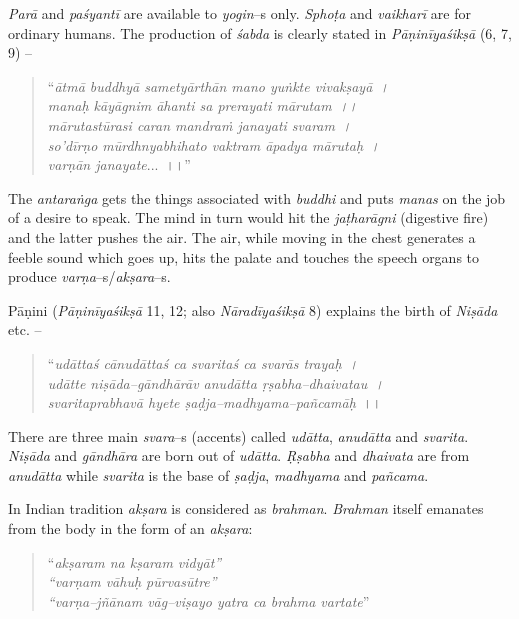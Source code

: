 \textit{Parā} and \textit{paśyantī} are available to \textit{yogin}–s only. \textit{Sphoṭa} and \textit{vaikharī} are for ordinary humans. The production of \textit{śabda} is clearly stated in \textit{Pāṇinīyaśikṣā} (6, 7, 9) –

\begin{verse}
“\textit{ātmā buddhyā sametyārthān mano yuṅkte vivakṣayā~।}\\\textit{manaḥ kāyāgnim āhanti sa prerayati mārutam~।।}\\\textit{mārutastūrasi caran mandraṁ janayati svaram~।}\\\textit{so’dīrṇo mūrdhnyabhihato vaktram āpadya mārutaḥ~।}\\\textit{varṇān janayate}...~।।”
\end{verse}

The \textit{antaraṅga} gets the things associated with \textit{buddhi} and puts \textit{manas} on the job of a desire to speak. The mind in turn would hit the \textit{jaṭharāgni} (digestive fire) and the latter pushes the air. The air, while moving in the chest generates a feeble sound which goes up, hits the palate and touches the speech organs to produce \textit{varṇa}–s/\textit{akṣara}–s.

Pāṇini (\textit{Pāṇinīyaśikṣā} 11, 12; also \textit{Nāradīyaśikṣā} 8) explains the birth of \textit{Niṣāda} etc. –

\begin{verse}
“\textit{udāttaś cānudāttaś ca svaritaś ca svarās trayaḥ~।}\\\textit{udātte niṣāda–gāndhārāv anudātta ṛṣabha–dhaivatau~।}\\\textit{svaritaprabhavā hyete ṣaḍja–madhyama–pañcamāḥ}~।।
\end{verse}

There are three main \textit{svara}–s (accents) called \textit{udātta}, \textit{anudātta} and \textit{svarita}. \textit{Niṣāda} and \textit{gāndhāra} are born out of \textit{udātta}. \textit{Ṛṣabha} and \textit{dhaivata} are from \textit{anudātta} while \textit{svarita} is the base of \textit{ṣaḍja}, \textit{madhyama} and \textit{pañcama}.

In Indian tradition \textit{akṣara} is considered as \textit{brahman}. \textit{Brahman} itself emanates from the body in the form of an \textit{akṣara}:

\begin{verse}
“\textit{akṣaram na kṣaram vidyāt”}\\\textit{“varṇam vāhuḥ pūrvasūtre”}\\\textit{“varṇa–jñānam vāg–viṣayo yatra ca brahma vartate}”
\end{verse}

